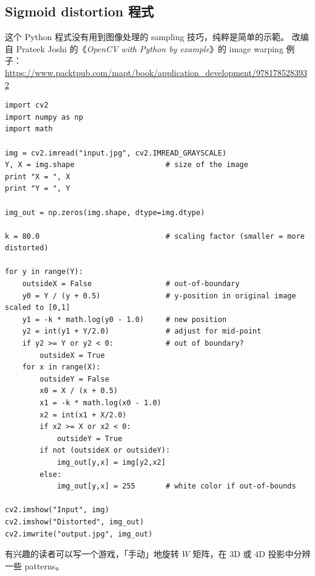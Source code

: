 \documentclass[orivec]{llncs}
\newcommand{\cc}[2]{#1}
\newcommand{\cc}[2]{#2}
\begin{document}
\begin{tcolorbox}[colback=lightyellow, breakable, enhanced]
\section*{\cc{Sigmoid distortion 程式}{Code for sigmoid distortion}}

\cc{
这个 Python 程式没有用到图像处理的 sampling 技巧，纯粹是简单的示範。 改编自 Prateek Joshi 的《\textit{OpenCV with Python by example}》的 image warping 例子： \\  %
}{
This Python program is adapted from Prateek Joshi's $\langle$\textit{OpenCV with Python by example}$\rangle$, section on ``image warping''.  It is just a simple demo, which does not use advanced image sampling techniques. \\
}
\footnotesize \url{https://www.packtpub.com/mapt/book/application_development/9781785283932}

\footnotesize
\begin{verbatim}
import cv2
import numpy as np
import math

img = cv2.imread("input.jpg", cv2.IMREAD_GRAYSCALE)
Y, X = img.shape                     # size of the image
print "X = ", X
print "Y = ", Y

img_out = np.zeros(img.shape, dtype=img.dtype)

k = 80.0                             # scaling factor (smaller = more distorted)

for y in range(Y):
    outsideX = False                 # out-of-boundary
    y0 = Y / (y + 0.5)               # y-position in original image scaled to [0,1]
    y1 = -k * math.log(y0 - 1.0)     # new position
    y2 = int(y1 + Y/2.0)             # adjust for mid-point
    if y2 >= Y or y2 < 0:            # out of boundary?
        outsideX = True
    for x in range(X):
        outsideY = False
        x0 = X / (x + 0.5)
        x1 = -k * math.log(x0 - 1.0)
        x2 = int(x1 + X/2.0)
        if x2 >= X or x2 < 0:
            outsideY = True
        if not (outsideX or outsideY):
            img_out[y,x] = img[y2,x2]
        else:
            img_out[y,x] = 255       # white color if out-of-bounds

cv2.imshow("Input", img)
cv2.imshow("Distorted", img_out)
cv2.imwrite("output.jpg", img_out)
\end{verbatim}
\normalsize

\cc{
有兴趣的读者可以写一个游戏，「手动」地旋转 $W$ 矩阵，在 3D 或 4D 投影中分辨一些 patterns。
}{
The interested reader can try to make a game, where the player manually ``rotate'' the $W$ matrix of a neural network, to recognize some visual patterns (perhaps projected from 3D or 4D to 2D).
}
\end{tcolorbox}
\end{document}
